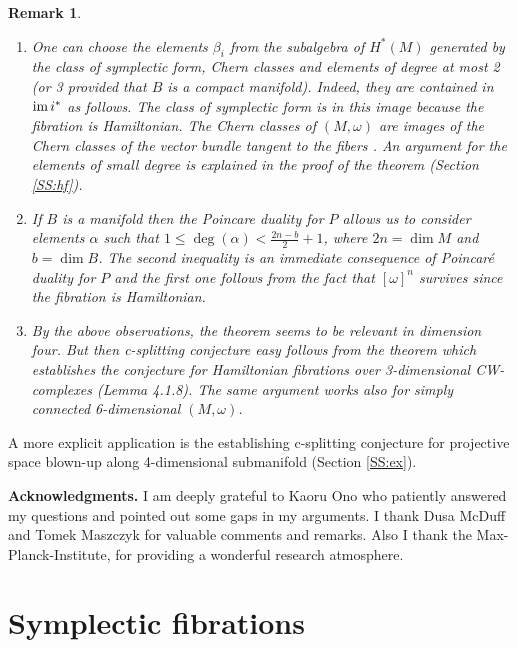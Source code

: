 \documentclass[a4paper,14pt]{article}
\newcommand{\al}{{\alpha}}
\newcommand{\be}{{\beta}}
\newcommand{\om}{{\omega}}
\newcommand{\Mo}{(M,\omega )}
\newcommand{\im}{\text {im \!}}
\newcommand{\BS}{{\bigskip}}
\newtheorem{rem}[theorem]{Remark}
\numberwithin{equation}{section}
\begin{document}
\begin{rem}\label{R:ham}{\em \hfill

\begin{enumerate}
\item
One can choose  the elements $\be_i$ from the subalgebra
of $H^*(M)$ generated by the class of symplectic form,
Chern classes and elements of degree at most 2 (or 3 provided
that $B$ is a compact manifold). Indeed, they
are contained in $\im i^*$ as follows. The class
of symplectic form is in this image because the fibration is
Hamiltonian. The Chern classes of $\Mo $ are images of the Chern
classes of the vector bundle tangent to the fibers \cite{k}.
An argument for the elements of small degree is explained in
the proof of the theorem (Section \ref{SS:hf}).

\item
If $B$ is a manifold then the Poincare duality for $P$
allows us to consider elements $\al $ such that
$1\leq \deg (\al )< \frac{2n-b}{2} + 1$, where $2n=\dim M$
and $b=\dim B$. The second inequality is an immediate consequence
of Poincar\' e duality for $P$ and the first one follows from the
fact that $[\om ]^n$ survives since the fibration is Hamiltonian.
\item
By the above observations,
the theorem seems to be relevant in dimension four.
But then c-splitting conjecture easy follows from the theorem
which establishes the conjecture for Hamiltonian fibrations
over 3-dimensional CW-complexes \cite{lm} (Lemma 4.1.8). 
The same argument
works also for simply connected 6-dimensional $\Mo $.
\end{enumerate}
}
\end{rem}


A more explicit application  is the
establishing c-splitting conjecture for projective space
blown-up along 4-dimensional submanifold (Section 
\ref{SS:ex}).


\BS

\noindent
{\bf Acknowledgments.} I am deeply grateful to Kaoru Ono
who patiently answered my questions and pointed out some
gaps in my arguments. I thank Dusa McDuff and Tomek Maszczyk
for valuable comments and remarks.
Also I thank the Max-Planck-Institute,
for providing a wonderful research atmosphere. 

\BS



\section{Symplectic fibrations}\label{S:sf}
\end{document}
